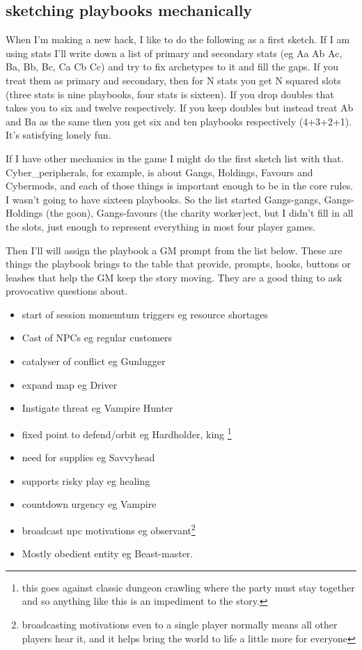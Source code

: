 \documentclass{tufte-handout}
\begin{document}
\subsection{sketching playbooks mechanically}
When I'm making a new hack, I like to do the following as a first sketch. If I am using stats I'll write down a list of primary and secondary stats (eg Aa Ab Ac, Ba, Bb, Bc, Ca Cb Cc) and try to fix archetypes to it and fill the gaps. If you treat them as primary and secondary, then for N stats you get N squared slots (three stats is nine playbooks, four stats is sixteen). If you drop doubles that takes you to six and twelve respectively. If you keep doubles but instead treat Ab and Ba as the same then you get six and ten playbooks respectively (4+3+2+1). It's satisfying lonely fun. 

If I have other mechanics in the game I might do the first sketch list with that. Cyber\_peripherals, for example, is about Gangs, Holdings, Favours and Cybermods, and each of those things is important enough to be in the core rules. I wasn't going to have sixteen playbooks. So the list started Gangs-gangs, Gangs-Holdings (the goon), Gangs-favours (the charity worker)ect, but I didn't fill in all the slots, just enough to represent everything in most four player games.

Then I'll will assign the playbook a GM prompt from the list below. These are things the playbook brings to the table that provide, prompts, hooks, buttons or leashes that help the GM keep the story moving.  They are a good thing to ask provocative questions about.

\begin{itemize}
\item start of session momemtum triggers eg resource shortages
\item Cast of NPCs  eg regular customers
\item catalyser of conflict eg Gunlugger
\item expand map eg Driver
\item Instigate threat eg Vampire Hunter
\item fixed point to defend/orbit eg Hardholder, king \footnote{this goes against classic dungeon crawling where the party must stay together and so anything like this is an impediment to the story.}
\item need for supplies eg Savvyhead
\item supports risky play eg healing
\item countdown urgency eg Vampire
\item broadcast npc motivations eg observant\footnote{broadcasting motivations even to a single player normally means all other players hear it, and it helps bring the world to life a little more for everyone}
\item Mostly obedient entity eg Beast-master.
\end{itemize}
\end{document}
